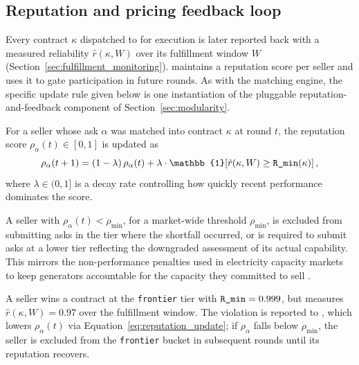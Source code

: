 \subsection{Reputation and pricing feedback loop}
\label{sec:reputation}

Every contract $\kappa$ dispatched to \NoesisServer{} for execution is later
reported back with a measured reliability $\hat r(\kappa, W)$ over its
fulfillment window $W$ (Section~\ref{sec:fulfillment_monitoring}).
\NoesisMarket{} maintains a reputation score per seller and uses it to gate
participation in future rounds. As with the matching engine, the specific
update rule given below is one instantiation of the pluggable
reputation-and-feedback component of Section~\ref{sec:modularity}.

\begin{definition}
\label{def:reputation}
For a seller whose ask $\alpha$ was matched into contract $\kappa$ at
round $t$, the reputation score $\rho_\alpha(t) \in [0, 1]$ is updated as
\begin{equation}
  \label{eq:reputation_update}
  \rho_\alpha(t + 1)
    = (1 - \lambda) \, \rho_\alpha(t)
    + \lambda \cdot \mathbb{1}\!\left[
        \hat r(\kappa, W) \geq \rminattr(\kappa)
      \right],
\end{equation}
where $\lambda \in (0, 1]$ is a decay rate controlling how quickly recent
performance dominates the score.
\end{definition}

A seller with $\rho_\alpha(t) < \rho_{\min}$, for a market-wide threshold
$\rho_{\min}$, is excluded from submitting asks in the tier where the
shortfall occurred, or is required to submit asks at a lower tier
reflecting the downgraded assessment of its actual capability. This
mirrors the non-performance penalties used in electricity capacity markets
to keep generators accountable for the capacity they committed to sell
\cite{cramtonstoft2005}.

\begin{example}[Default]
\label{ex:default}
A seller wins a contract at the \texttt{frontier} tier with
$\textnormal{\texttt{R\_min}} = 0.999$, but \NoesisServer{} measures $\hat r(\kappa, W) =
0.97$ over the fulfillment window. The violation is reported to
\NoesisMarket, which lowers $\rho_\alpha(t)$ via
Equation~\eqref{eq:reputation_update}; if $\rho_\alpha$ falls below
$\rho_{\min}$, the seller is excluded from the \texttt{frontier} bucket in
subsequent rounds until its reputation recovers.
\end{example}


